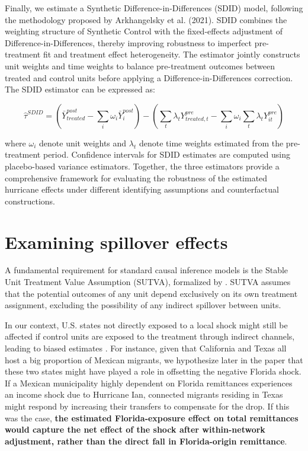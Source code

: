 Finally, we estimate a Synthetic Difference-in-Differences (SDID) model, following the methodology proposed by Arkhangelsky et al. (2021). SDID combines the weighting structure of Synthetic Control with the fixed-effects adjustment of Difference-in-Differences, thereby improving robustness to imperfect pre-treatment fit and treatment effect heterogeneity. The estimator jointly constructs unit weights and time weights to balance pre-treatment outcomes between treated and control units before applying a Difference-in-Differences correction. The SDID estimator can be expressed as:

\begin{equation}
\hat{\tau}^{SDID} =
\left(
\bar{Y}^{post}_{treated} - \sum_i \omega_i \bar{Y}^{post}_{i}
\right)
-
\left(
\sum_t \lambda_t Y^{pre}_{treated,t}
-
\sum_i \omega_i \sum_t \lambda_t Y^{pre}_{it}
\right)
\end{equation}

where \(\omega_i\) denote unit weights and \(\lambda_t\) denote time weights estimated from the pre-treatment period. Confidence intervals for SDID estimates are computed using placebo-based variance estimators. Together, the three estimators provide a comprehensive framework for evaluating the robustness of the estimated hurricane effects under different identifying assumptions and counterfactual constructions.

\section{Examining spillover effects}

A fundamental requirement for standard causal inference models is the Stable Unit Treatment Value Assumption (SUTVA), formalized by \textcite{rubin1980}. SUTVA assumes that the potential outcomes of any unit depend exclusively on its own treatment assignment, excluding the possibility of any indirect spillover between units.

In our context, U.S. states not directly exposed to a local shock might still be affected if control units are exposed to the treatment through indirect channels, leading to biased estimates \parencite{clarke2017}. For instance, given that California and Texas all host a big proportion of Mexican migrants, we hypothesize later in the paper that these two states might have played a role in offsetting the negative Florida shock. If a Mexican municipality highly dependent on Florida remittances experiences an income shock due to Hurricane Ian, connected migrants residing in Texas might respond by increasing their transfers to compensate for the drop. If this was the case, \textbf{ the estimated Florida-exposure effect on total remittances would capture the net effect of the shock after within-network adjustment, rather than the direct fall in Florida-origin remittance}. 

